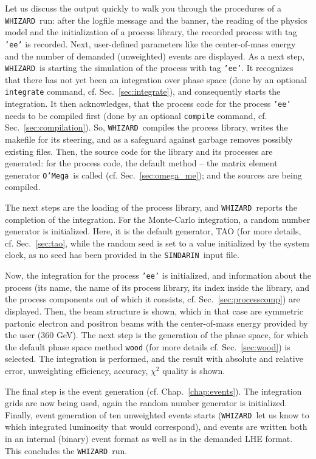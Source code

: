 \documentclass[12pt]{book}
\newcommand{\ttt}[1]{\texttt{#1}}
\newcommand{\whizard}{\ttt{WHIZARD}}
\newcommand{\oMega}{\ttt{O'Mega}}
\newcommand{\sindarin}{\ttt{SINDARIN}}
\begin{document}
Let us discuss the output quickly to walk you through the procedures
of a \whizard\ run: after the logfile message and the banner, the
reading of the physics model and the initialization of a process
library, the recorded process with tag \ttt{'ee'} is recorded. Next,
user-defined parameters like the center-of-mass energy and the number
of demanded (unweighted) events are displayed. As a next step,
\whizard\ is starting the simulation of the process with tag
\ttt{'ee'}. It recognizes that there has not yet been an integration
over phase space (done by an optional \ttt{integrate} command,
cf. Sec.~\ref{sec:integrate}), and consequently starts the
integration. It then acknowledges, that the process code for the
process \ttt{'ee'} needs to be compiled first (done by an optional
\ttt{compile} command, cf. Sec.~\ref{sec:compilation}). So, \whizard\
compiles the process library, writes the makefile for its steering,
and as a safeguard against garbage removes possibly existing
files. Then, the source code for the library and its processes are
generated: for the process code, the default method -- the matrix
element generator \oMega\ is called (cf. Sec.~\ref{sec:omega_me}); and
the sources are being compiled.

The next steps are the loading of the process library, and \whizard\
reports the completion of the integration. For the Monte-Carlo
integration, a random number generator is initialized. Here, it is the
default generator, TAO (for more details, cf. Sec.~\ref{sec:tao},
while the random seed is set to a value initialized by the system
clock, as no seed has been provided in the \sindarin\ input file.

Now, the integration for the process \ttt{'ee'} is initialized, and
information about the process (its name, the name of its process
library, its index inside the library, and the process components out
of which it consists, cf. Sec.~\ref{sec:processcomp}) are
displayed. Then, the beam structure is shown, which in that case are
symmetric partonic electron and positron beams with the center-of-mass
energy provided by the user (360 GeV). The next step is the generation
of the phase space, for which the default phase space method
\ttt{wood} (for more details cf. Sec.~\ref{sec:wood}) is selected. The
integration is performed, and the result with absolute and relative
error, unweighting efficiency, accuracy, $\chi^2$ quality is shown.

The final step is the event generation
(cf. Chap.~\ref{chap:events}). The integration grids are now being
used, again the random number generator is initialized. Finally, event
generation of ten unweighted events starts (\whizard\ let us know to
which integrated luminosity that would correspond), and events are
written both in an internal (binary) event format as well as in the
demanded LHE format. This concludes the \whizard\ run.
\end{document}
